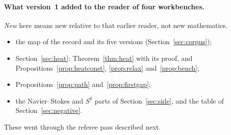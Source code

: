 \paragraph{What version~1 added to the reader of four workbenches.}
\emph{New} here means new relative to that earlier reader, not new mathematics.
\begin{itemize}
\item the map of the record and its five versions (Section~\ref{sec:corpus});
\item Section~\ref{sec:heat}: Theorem~\ref{thm:heat} with its proof, and Propositions~\ref{prop:heatconst}, \ref{prop:relax} and~\ref{prop:bench};
\item Propositions~\ref{prop:path} and~\ref{prop:firstgap};
\item the Navier--Stokes and $S^6$ parts of Section~\ref{sec:side}, and the table of Section~\ref{sec:negative}.
\end{itemize}
These went through the referee pass described next.

